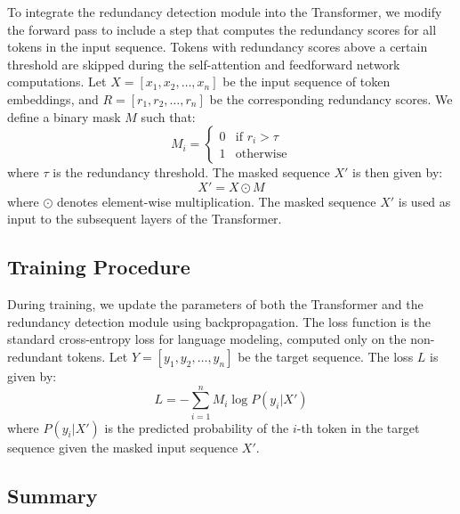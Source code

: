 \documentclass{article} %
\begin{document}
To integrate the redundancy detection module into the Transformer, we modify the forward pass to include a step that computes the redundancy scores for all tokens in the input sequence. Tokens with redundancy scores above a certain threshold are skipped during the self-attention and feedforward network computations. Let \( X = [x_1, x_2, \ldots, x_n] \) be the input sequence of token embeddings, and \( R = [r_1, r_2, \ldots, r_n] \) be the corresponding redundancy scores. We define a binary mask \( M \) such that:
\begin{equation}
    M_i = \begin{cases}
        0 & \text{if } r_i > \tau \\
        1 & \text{otherwise}
    \end{cases}
\end{equation}
where \( \tau \) is the redundancy threshold. The masked sequence \( X' \) is then given by:
\begin{equation}
    X' = X \odot M
\end{equation}
where \( \odot \) denotes element-wise multiplication. The masked sequence \( X' \) is used as input to the subsequent layers of the Transformer.

\subsection{Training Procedure}

During training, we update the parameters of both the Transformer and the redundancy detection module using backpropagation. The loss function is the standard cross-entropy loss for language modeling, computed only on the non-redundant tokens. Let \( Y = [y_1, y_2, \ldots, y_n] \) be the target sequence. The loss \( L \) is given by:
\begin{equation}
    L = -\sum_{i=1}^{n} M_i \log P(y_i | X')
\end{equation}
where \( P(y_i | X') \) is the predicted probability of the \( i \)-th token in the target sequence given the masked input sequence \( X' \).

\subsection{Summary}
\end{document}
